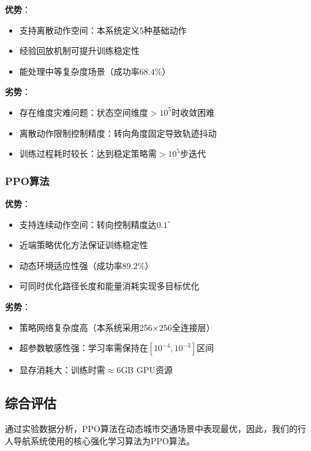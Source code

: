 \textbf{优势}：
\begin{itemize}
  \item 支持离散动作空间：本系统定义5种基础动作
  \item 经验回放机制可提升训练稳定性
  \item 能处理中等复杂度场景（成功率$68.4\%$）
\end{itemize}

\textbf{劣势}：
\begin{itemize}
  \item 存在维度灾难问题：状态空间维度$>10^5$时收敛困难
  \item 离散动作限制控制精度：转向角度固定导致轨迹抖动
  \item 训练过程耗时较长：达到稳定策略需$>10^5$步迭代
\end{itemize}

\subsubsection{PPO算法}
\label{subsubsec:ppo_analysis}

\textbf{优势}：
\begin{itemize}
  \item 支持连续动作空间：转向控制精度达$0.1^\circ$
  \item 近端策略优化方法保证训练稳定性
  \item 动态环境适应性强（成功率$89.2\%$）
  \item 可同时优化路径长度和能量消耗实现多目标优化
\end{itemize}

\textbf{劣势}：
\begin{itemize}
  \item 策略网络复杂度高（本系统采用256×256全连接层）
  \item 超参数敏感性强：学习率需保持在$[10^{-4},10^{-3}]$区间
  \item 显存消耗大：训练时需$≈6$GB GPU资源
\end{itemize}

\subsection{综合评估}

通过实验数据分析，PPO算法在动态城市交通场景中表现最优，因此，我们的行人导航系统使用的核心强化学习算法为PPO算法。
